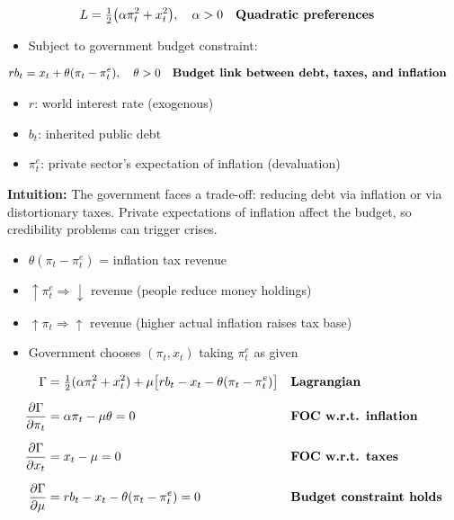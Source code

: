 \documentclass[12pt]{article}
\begin{document}
\singlespacing
\begin{align}
L &= \tfrac{1}{2} \big(\alpha \pi_t^2 + x_t^2 \big), \quad \alpha > 0 && \text{\textbf{Quadratic preferences}}
\end{align}

\begin{itemize}
    \item Subject to government budget constraint:
\end{itemize}

\singlespacing
\begin{align}
r b_t &= x_t + \theta (\pi_t - \pi_t^e), \quad \theta > 0 && \text{\textbf{Budget link between debt, taxes, and inflation}}
\end{align}

\begin{itemize}
    \item $r$: world interest rate (exogenous) \\
    \item $b_t$: inherited public debt \\
    \item $\pi_t^e$: private sector’s expectation of inflation (devaluation)
\end{itemize}

\textbf{Intuition:} The government faces a trade-off: reducing debt via inflation or via distortionary taxes. Private expectations of inflation affect the budget, so credibility problems can trigger crises.

\begin{itemize}
    \item $\theta(\pi_t - \pi_t^e)$ = inflation tax revenue
    \item $\uparrow \pi_t^e \Rightarrow \downarrow$ revenue (people reduce money holdings)
    \item $\uparrow \pi_t \Rightarrow \uparrow$ revenue (higher actual inflation raises tax base)
    \item Government chooses $(\pi_t, x_t)$ taking $\pi_t^e$ as given
\end{itemize}

\singlespacing
\begin{align}
\Gamma &= \tfrac{1}{2}(\alpha \pi_t^2 + x_t^2) + \mu \big[r b_t - x_t - \theta(\pi_t - \pi_t^e)\big] && \text{\textbf{Lagrangian}} \\[6pt]
\frac{\partial \Gamma}{\partial \pi_t} &= \alpha \pi_t - \mu \theta = 0 && \text{\textbf{FOC w.r.t. inflation}} \\[6pt]
\frac{\partial \Gamma}{\partial x_t} &= x_t - \mu = 0 && \text{\textbf{FOC w.r.t. taxes}} \\[6pt]
\frac{\partial \Gamma}{\partial \mu} &= r b_t - x_t - \theta (\pi_t - \pi_t^e) = 0 && \text{\textbf{Budget constraint holds}}
\end{align}
\end{document}

